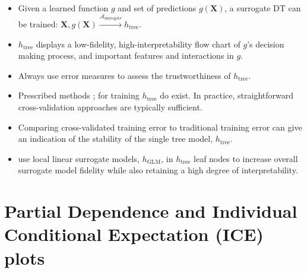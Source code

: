 \documentclass{article}
\begin{document}
\begin{itemize}
	
	\item Given a learned function $g$ and set of predictions $g(\mathbf{X})$, a surrogate DT can be trained: $ \mathbf{X}, g(\mathbf{X}) \xrightarrow{\mathcal{A}_{\text{surrogate}}} h_{\text{tree}}$.
	
	\item $h_{\text{tree}}$ displays a low-fidelity, high-interpretability flow chart of $g$'s decision making process, and important features and interactions in $g$.	
	
\end{itemize}

\begin{itemize}
	
	\item Always use error measures to assess the trustworthiness of $h_{\text{tree}}$.
	
	\item Prescribed methods \cite{dt_surrogate1}; \cite{dt_surrogate2} for training $h_{\text{tree}}$ do exist. In practice, straightforward cross-validation approaches are typically sufficient. 
	
	\item Comparing cross-validated training error to traditional training error can give an indication of the stability of the single tree model, $h_{\text{tree}}$.
	
	\item \cite{lime-sup} use local linear surrogate models, $h_{\text{GLM}}$, in $h_{\text{tree}}$ leaf nodes to increase overall surrogate model fidelity while also retaining a high degree of interpretability.
	
\end{itemize}

\section{Partial Dependence and Individual Conditional Expectation (ICE) plots}
\label{sec:pd_ice}
\end{document}

